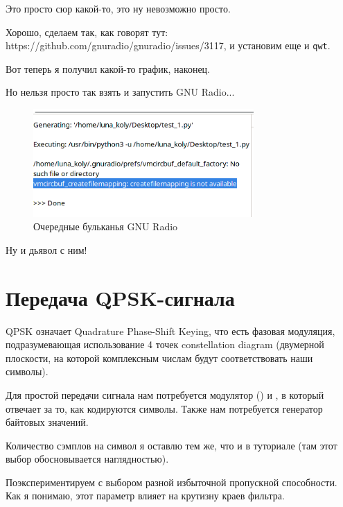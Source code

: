 \documentclass[a4paper,12pt]{report}
\begin{document}
    Это просто сюр какой-то, это ну невозможно просто.
    
    Хорошо, сделаем так, как говорят тут: https://github.com/gnuradio/gnuradio/issues/3117, и установим еще и \texttt{qwt}.
    
    Вот теперь я получил какой-то график, наконец.
    
    Но нельзя просто так взять и запустить GNU Radio...
    
    \begin{figure}[H]
        \centering
        \includegraphics[width=0.75\textwidth]{images/error_5.png}
        \caption{Очередные бульканья GNU Radio}
        \label{fig:error_5}
    \end{figure}
    
    Ну и дьявол с ним!
    
    \chapter{Передача QPSK-сигнала}
    
    QPSK означает Quadrature Phase-Shift Keying\cite{qpsk_wiki}, что есть фазовая модуляция, подразумевающая использование 4 точек constellation diagram (двумерной плоскости, на которой комплексным числам будут соответствовать наши символы). 
    
    Для простой передачи сигнала нам потребуется модулятор () и , в который отвечает за то, как кодируются символы. Также нам потребуется генератор байтовых значений.
    
    Количество сэмплов на символ я оставлю тем же, что и в туториале (там этот выбор обосновывается наглядностью).
    
    Поэкспериментируем с выбором разной избыточной пропускной способности. Как я понимаю, этот параметр влияет на крутизну краев фильтра.
    
\end{document}
